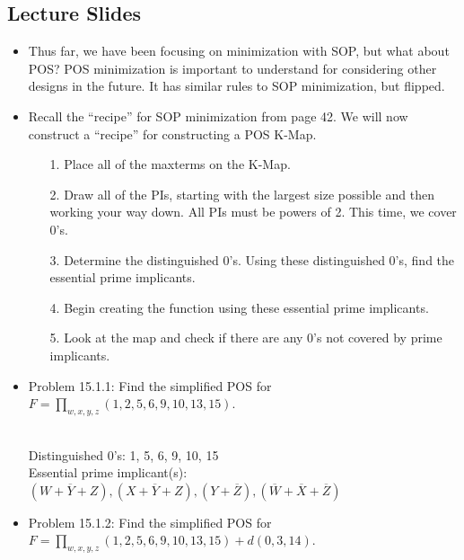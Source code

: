 \documentclass[10pt,a4paper]{article}
\newcommand{\answer}[1]{\boxed{\text{Answer: #1}}}
\newcommand{\ol}[1]{\overline{#1}}
\begin{document}
\subsection{Lecture Slides}
\begin{itemize}
\item Thus far, we have been focusing on minimization with SOP, but what about POS? POS minimization is important to understand for considering other designs in the future. It has similar rules to SOP minimization, but flipped. 
\item Recall the ``recipe'' for SOP minimization from page 42. We will now construct a ``recipe'' for constructing a POS K-Map.
\begin{enumerate}
\item [1.] Place all of the maxterms on the K-Map.
\item [2.] Draw all of the PIs, starting with the largest size possible and then working your way down. All PIs must be powers of 2. This time, we cover 0's. 
\item [3.] Determine the distinguished 0's. Using these distinguished 0's, find the essential prime implicants. 
\item [4.] Begin creating the function using these essential prime implicants.
\item [5.] Look at the map and check if there are any 0's not covered by prime implicants. 
\end{enumerate}
\item Problem 15.1.1: Find the simplified POS for $F=\prod_{w,x,y,z}(1,2,5,6,9,10,13,15)$.\\
\\
Distinguished 0's: 1, 5, 6, 9, 10, 15\\
Essential prime implicant(s): $(W+\ol{Y}+Z), (X+\ol{Y}+Z), (Y+\ol{Z}), (\ol{W}+\ol{X}+\ol{Z})$\\
\answer{$F=(W+\ol{Y}+Z)(X+\ol{Y}+Z)(Y+\ol{Z})(\ol{W}+\ol{X}+\ol{Z})$}
\pagebreak
\item Problem 15.1.2: Find the simplified POS for $F=\prod_{w,x,y,z}(1,2,5,6,9,10,13,15)+d(0,3,14)$.\\

\end{itemize}
\end{document}
